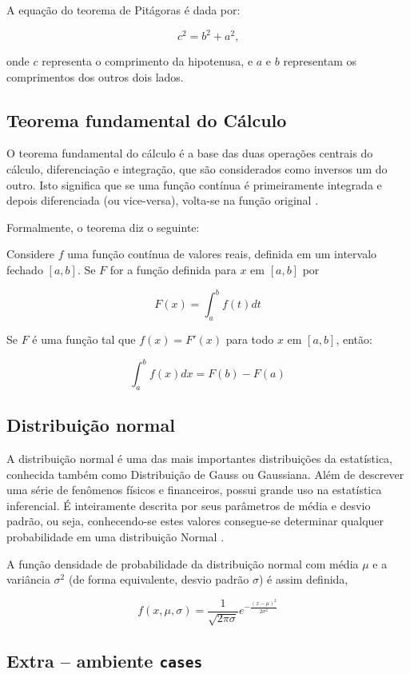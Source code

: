 \documentclass[12pt]{article}
\begin{document}
A equação do teorema de Pitágoras é dada por:

$$c^2 = b^2 + a^2 \text{,}$$

onde $c$ representa o comprimento da hipotenusa, e $a$ e $b$ representam os comprimentos dos outros dois lados.

\subsection{Teorema fundamental do Cálculo}

O teorema fundamental do cálculo é a base das duas operações centrais do cálculo, diferenciação e integração, que são considerados como inversos um do outro. Isto significa que se uma função contínua é primeiramente integrada e depois diferenciada (ou vice-versa), volta-se na função original \cite{calculo}.

Formalmente, o teorema diz o seguinte:

Considere $f$ uma função contínua de valores reais, definida em um intervalo fechado $[a, b]$. Se $F$ for a função definida para $x$ em $[a, b]$ por

$$F(x) = \int_a^b f(t)dt$$

Se $F$ é uma função tal que $f(x) = F'(x)$ para todo $x$ em $[a, b]$, então:

$$\int_a^b f(x)dx = F(b) - F(a)$$


\subsection{Distribuição normal}

A distribuição normal é uma das mais importantes distribuições da estatística, conhecida também como Distribuição de Gauss ou Gaussiana. Além de descrever uma série de fenômenos físicos e financeiros, possui grande uso na estatística inferencial. É inteiramente descrita por seus parâmetros de média e desvio padrão, ou seja, conhecendo-se estes valores consegue-se determinar qualquer probabilidade em uma distribuição Normal \cite{normal}.

A função densidade de probabilidade da distribuição normal com média $\mu$ e a variância $\sigma^2$ (de forma equivalente, desvio padrão $\sigma$) é assim definida,


$$f(x,\mu,\sigma) = \frac{1}{\sqrt{2\pi\sigma}}e^{-\frac{(x-\mu)^2}{2\sigma^2}}$$

\subsection{Extra -- ambiente \texttt{cases}}
\end{document}
